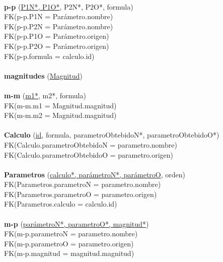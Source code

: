 \documentclass[a4paper,10pt]{article}
\newcommand\tab[1][1cm]{\hspace*{#1}}
\begin{document}
\paragraph{}
{\bf p-p} (\underline{P1N*, P1O*}, P2N*, P2O*, formula)\\
\tab FK(p-p.P1N = Parámetro.nombre)\\
\tab FK(p-p.P2N = Parámetro.nombre)\\
\tab FK(p-p.P1O = Parámetro.origen)\\
\tab FK(p-p.P2O = Parámetro.origen)\\
\tab FK(p-p.formula = calculo.id)

\paragraph{}
{\bf magnitudes} (\underline{Magnitud})

\paragraph{}
{\bf m-m} (\underline{m1*}, m2*, formula)\\
\tab FK(m-m.m1 = Magnitud.magnitud)\\
\tab FK(m-m.m2 = Magnitud.magnitud)

\paragraph{}
{\bf Calculo} (\underline{id}, formula, parametroObtebidoN*, parametroObtebidoO*)\\
\tab FK(Calculo.parametroObtebidoN = parametro.nombre)\\
\tab FK(Calculo.parametroObtebidoO = parametro.origen)

\paragraph{}
{\bf Parametros} (\underline{calculo*, parámetroN*, parámetroO}, orden)\\
\tab FK(Parametros.parametroN = parametro.nombre)\\
\tab FK(Parametros.parametroO = parametro.origen)\\
\tab FK(Parametros.calculo = calculo.id)

\paragraph{}
{\bf m-p} (\underline{parámetroN*, parametroO*, magnitud*})\\
\tab FK(m-p.parametroN = parametro.nombre)\\
\tab FK(m-p.parametroO = parametro.origen)\\
\tab FK(m-p.magnitud = magnitud.magnitud)
\end{document}
